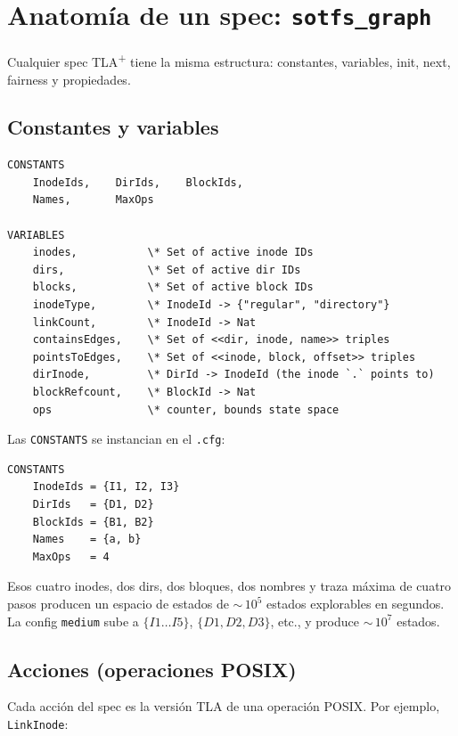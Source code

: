 \section{Anatomía de un spec: \texttt{sotfs\_graph}}

Cualquier spec TLA\textsuperscript{+} tiene la misma estructura:
constantes, variables, init, next, fairness y propiedades.

\subsection*{Constantes y variables}

\begin{lstlisting}[language=tla, caption={Estado del spec
\texttt{sotfs\_graph}.}, label={lst:sotfs-graph-vars}]
CONSTANTS
    InodeIds,    DirIds,    BlockIds,
    Names,       MaxOps

VARIABLES
    inodes,           \* Set of active inode IDs
    dirs,             \* Set of active dir IDs
    blocks,           \* Set of active block IDs
    inodeType,        \* InodeId -> {"regular", "directory"}
    linkCount,        \* InodeId -> Nat
    containsEdges,    \* Set of <<dir, inode, name>> triples
    pointsToEdges,    \* Set of <<inode, block, offset>> triples
    dirInode,         \* DirId -> InodeId (the inode `.` points to)
    blockRefcount,    \* BlockId -> Nat
    ops               \* counter, bounds state space
\end{lstlisting}

Las \texttt{CONSTANTS} se instancian en el \texttt{.cfg}:

\begin{lstlisting}[language=tla, caption={\texttt{sotfs\_graph.cfg}: la
config \texttt{small}.}]
CONSTANTS
    InodeIds = {I1, I2, I3}
    DirIds   = {D1, D2}
    BlockIds = {B1, B2}
    Names    = {a, b}
    MaxOps   = 4
\end{lstlisting}

Esos cuatro inodes, dos dirs, dos bloques, dos nombres y traza máxima
de cuatro pasos producen un espacio de estados de $\sim$\,$10^5$
estados explorables en segundos. La config \texttt{medium} sube a
$\{I1\ldots I5\}$, $\{D1, D2, D3\}$, etc., y produce $\sim$\,$10^7$
estados.

\subsection*{Acciones (operaciones POSIX)}

Cada acción del spec es la versión TLA de una operación POSIX. Por
ejemplo, \texttt{LinkInode}:

